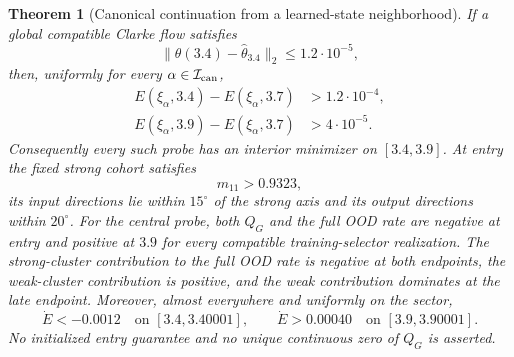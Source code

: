 \documentclass[10pt]{article}
\newtheorem{theorem}{Theorem}[section]
\theoremstyle{remark}\newtheorem{remark}[theorem]{Remark}
\begin{document}
\begin{theorem}[Canonical continuation from a learned-state neighborhood]
\label{thm:canonical-local-continuation}
If a global compatible Clarke flow satisfies
\begin{equation}\label{eq:canonical-entry}
 \|\theta(3.4)-\widehat\theta_{3.4}\|_2
 \le1.2\cdot10^{-5},
\end{equation}
then, uniformly for every $\alpha\in\mathcal I_{\rm can}$,
\begin{align}
 E(\xi_\alpha,3.4)-E(\xi_\alpha,3.7)&>1.2\cdot10^{-4},
 \label{eq:canonical-certified-drop}\\
 E(\xi_\alpha,3.9)-E(\xi_\alpha,3.7)&>4\cdot10^{-5}.
 \label{eq:canonical-certified-rebound}
\end{align}
Consequently every such probe has an interior minimizer on $[3.4,3.9]$.
At entry the fixed strong cohort satisfies
\[
 m_{11}>0.9323,
\]
its input directions lie within $15^\circ$ of the strong axis and its output
directions within $20^\circ$. For the central probe, both $Q_G$ and the full
OOD rate are negative at entry and positive at $3.9$ for every compatible
training-selector realization. The strong-cluster contribution to the full
OOD rate is negative at both endpoints, the weak-cluster contribution is
positive, and the weak contribution dominates at the late endpoint.
Moreover, almost everywhere and uniformly on the sector,
\[
 \dot E<-0.0012\quad\text{on }[3.4,3.40001],
 \qquad
 \dot E>0.00040\quad\text{on }[3.9,3.90001].
\]
No initialized entry guarantee and no unique continuous zero of $Q_G$ is
asserted.
\end{theorem}
\end{document}
